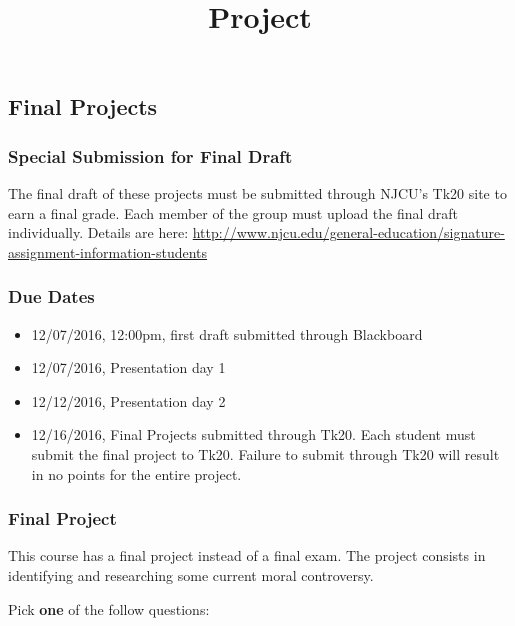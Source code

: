 \documentclass[]{article}
\title{Project}
\date{}
\begin{document}
\maketitle

\subsection{Final Projects}\label{final-projects}

\subsubsection{Special Submission for Final
Draft}\label{special-submission-for-final-draft}

The final draft of these projects must be submitted through NJCU's Tk20
site to earn a final grade. Each member of the group must upload the
final draft individually. Details are here:
\url{http://www.njcu.edu/general-education/signature-assignment-information-students}

\subsubsection{Due Dates}\label{due-dates}

\begin{itemize}
\itemsep1pt\parskip0pt
\item
  12/07/2016, 12:00pm, first draft submitted through Blackboard
\item
  12/07/2016, Presentation day 1
\item
  12/12/2016, Presentation day 2
\item
  12/16/2016, Final Projects submitted through Tk20. Each student must
  submit the final project to Tk20. Failure to submit through Tk20 will
  result in no points for the entire project.
\end{itemize}

\subsubsection{Final Project}\label{final-project}

This course has a final project instead of a final exam. The project
consists in identifying and researching some current moral controversy.

Pick \textbf{one} of the follow questions:
\end{document}
